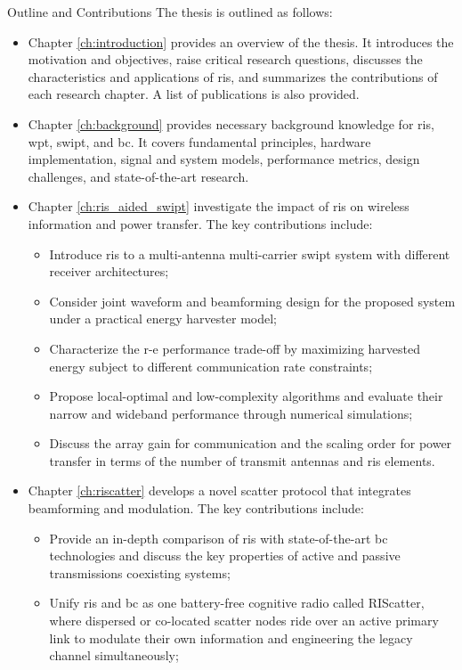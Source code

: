 \begin{section}{Outline and Contributions}
	The thesis is outlined as follows:
	\begin{itemize}
		\item Chapter \ref{ch:introduction} provides an overview of the thesis. It introduces the motivation and objectives, raise critical research questions, discusses the characteristics and applications of \gls{ris}, and summarizes the contributions of each research chapter. A list of publications is also provided.
		\item Chapter \ref{ch:background} provides necessary background knowledge for \gls{ris}, \gls{wpt}, \gls{swipt}, and \gls{bc}. It covers fundamental principles, hardware implementation, signal and system models, performance metrics, design challenges, and state-of-the-art research.
		\item Chapter \ref{ch:ris_aided_swipt} investigate the impact of \gls{ris} on wireless information and power transfer. The key contributions include:
		\begin{itemize}
			\item Introduce \gls{ris} to a multi-antenna multi-carrier \gls{swipt} system with different receiver architectures;
			\item Consider joint waveform and beamforming design for the proposed system under a practical energy harvester model;
			\item Characterize the \gls{r-e} performance trade-off by maximizing harvested energy subject to different communication rate constraints;
			\item Propose local-optimal and low-complexity algorithms and evaluate their narrow and wideband performance through numerical simulations;
			\item Discuss the array gain for communication and the scaling order for power transfer in terms of the number of transmit antennas and \gls{ris} elements.
		\end{itemize}
		\item Chapter \ref{ch:riscatter} develops a novel scatter protocol that integrates beamforming and modulation. The key contributions include:
		\begin{itemize}
			\item Provide an in-depth comparison of \gls{ris} with state-of-the-art \gls{bc} technologies and discuss the key properties of active and passive transmissions coexisting systems;
			\item Unify \gls{ris} and \gls{bc} as one battery-free cognitive radio called RIScatter, where dispersed or co-located scatter nodes ride over an active primary link to modulate their own information and engineering the legacy channel simultaneously;

\end{itemize}
\end{itemize}
\end{section}
